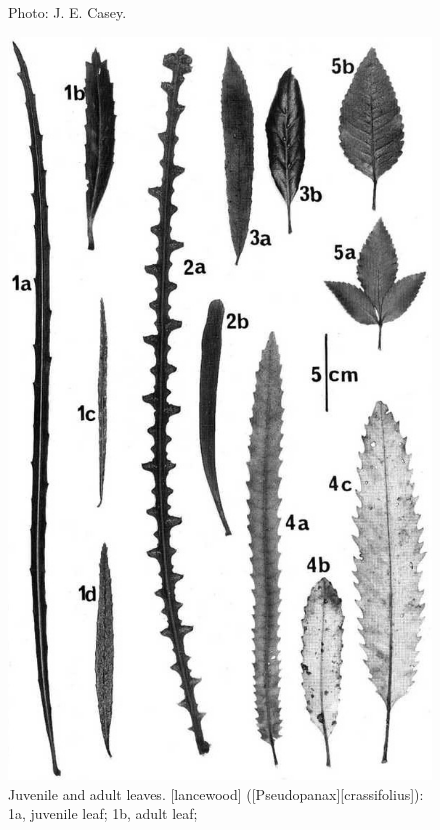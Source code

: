 \begin{figure}[!t]
\begin{minipage}[t]{\textwidth}
\begin{minipage}[t]{(\textwidth-\fgap) * \real{0.524}}
{			Photo: J. E. Casey.}%
			\label{fig:18pseudopanax}
		\end{minipage}\hspace{\fgap}%
		\begin{minipage}[t]{(\textwidth-\fgap) * \real{0.476}}
			\centering
			\includegraphics[width=\textwidth]{graphics/fig_019}
			\caption[Juvenile and adult leaves]{Juvenile and adult leaves.
			[lancewood] ([Pseudopanax][crassifolius]):
			1a, juvenile leaf;
			1b, adult leaf;
}
\end{minipage}
\end{minipage}
\end{figure}
